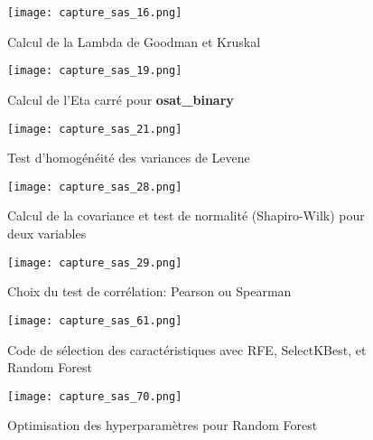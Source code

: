 \begin{figure}[H]
    \centering
    \texttt{[image: capture\_sas\_16.png]}
    \caption{Calcul de la Lambda de Goodman et Kruskal}
    \label{555}
\end{figure}
\vspace{10pt}

\begin{figure}[H]
    \centering
    \texttt{[image: capture\_sas\_19.png]}
    \caption{Calcul de l'Eta carré pour \textbf{osat\_binary}}
    \label{26203}
\end{figure}
\vspace{10pt}

\begin{figure}[H]
    \centering
    \texttt{[image: capture\_sas\_21.png]}
    \caption{Test d'homogénéité des variances de Levene}
    \label{168}
\end{figure}
\vspace{10pt}

\begin{figure}[H]
    \centering
    \texttt{[image: capture\_sas\_28.png]}
    \caption{Calcul de la covariance et test de normalité (Shapiro-Wilk) pour deux variables}
    \label{molka}
\end{figure}
\vspace{10pt}

\begin{figure}[H]
    \centering
    \texttt{[image: capture\_sas\_29.png]}
    \caption{Choix du test de corrélation: Pearson ou Spearman}
    \label{hamma}
\end{figure}
\vspace{10pt}

\begin{figure}[H]
    \centering
    \texttt{[image: capture\_sas\_61.png]}
    \caption{Code de sélection des caractéristiques avec RFE, SelectKBest, et Random Forest}
    \label{code_features_Selection}
\end{figure}
\vspace{10pt}

\begin{figure}[H]
    \centering
    \texttt{[image: capture\_sas\_70.png]}
    \caption{Optimisation des hyperparamètres pour Random Forest}
    \label{hyperparametres}
\end{figure}
\vspace{10pt}


